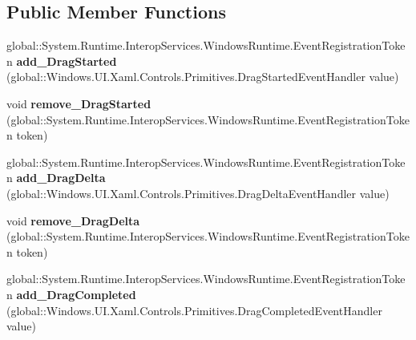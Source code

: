 \subsection*{Public Member Functions}
\begin{DoxyCompactItemize}
\item 
\mbox{\label{class_windows_1_1_u_i_1_1_xaml_1_1_controls_1_1_primitives_1_1_thumb_ab1e477ea93baeef13137c92d8314a13a}} 
global\+::\+System.\+Runtime.\+Interop\+Services.\+Windows\+Runtime.\+Event\+Registration\+Token {\bfseries add\+\_\+\+Drag\+Started} (global\+::\+Windows.\+U\+I.\+Xaml.\+Controls.\+Primitives.\+Drag\+Started\+Event\+Handler value)
\item 
\mbox{\label{class_windows_1_1_u_i_1_1_xaml_1_1_controls_1_1_primitives_1_1_thumb_a44985b0beddf8dcf180137b37763091e}} 
void {\bfseries remove\+\_\+\+Drag\+Started} (global\+::\+System.\+Runtime.\+Interop\+Services.\+Windows\+Runtime.\+Event\+Registration\+Token token)
\item 
\mbox{\label{class_windows_1_1_u_i_1_1_xaml_1_1_controls_1_1_primitives_1_1_thumb_ab21b89a45b43ce6913868468c69ad277}} 
global\+::\+System.\+Runtime.\+Interop\+Services.\+Windows\+Runtime.\+Event\+Registration\+Token {\bfseries add\+\_\+\+Drag\+Delta} (global\+::\+Windows.\+U\+I.\+Xaml.\+Controls.\+Primitives.\+Drag\+Delta\+Event\+Handler value)
\item 
\mbox{\label{class_windows_1_1_u_i_1_1_xaml_1_1_controls_1_1_primitives_1_1_thumb_aafa7ff7377726fee9d57013616690ae3}} 
void {\bfseries remove\+\_\+\+Drag\+Delta} (global\+::\+System.\+Runtime.\+Interop\+Services.\+Windows\+Runtime.\+Event\+Registration\+Token token)
\item 
\mbox{\label{class_windows_1_1_u_i_1_1_xaml_1_1_controls_1_1_primitives_1_1_thumb_a78452356d0361197920635b5002bf90f}} 
global\+::\+System.\+Runtime.\+Interop\+Services.\+Windows\+Runtime.\+Event\+Registration\+Token {\bfseries add\+\_\+\+Drag\+Completed} (global\+::\+Windows.\+U\+I.\+Xaml.\+Controls.\+Primitives.\+Drag\+Completed\+Event\+Handler value)

\end{DoxyCompactItemize}
